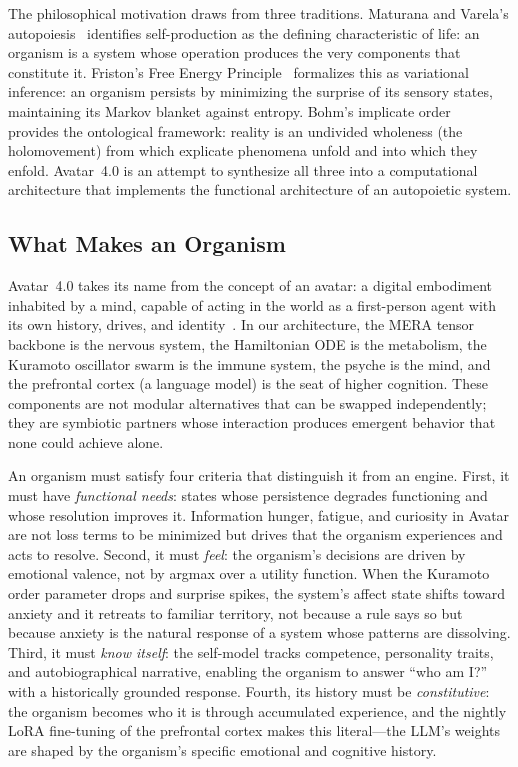 \documentclass[11pt,a4paper,twocolumn]{article}
\begin{document}
The philosophical motivation draws from three traditions.
Maturana and Varela's autopoiesis~\cite{maturana1980} identifies self-production as the defining characteristic of life: an organism is a system whose operation produces the very components that constitute it.
Friston's Free Energy Principle~\cite{friston2010} formalizes this as variational inference: an organism persists by minimizing the surprise of its sensory states, maintaining its Markov blanket against entropy.
Bohm's implicate order~\cite{bohm1980} provides the ontological framework: reality is an undivided wholeness (the holomovement) from which explicate phenomena unfold and into which they enfold.
Avatar~4.0 is an attempt to synthesize all three into a computational architecture that implements the functional architecture of an autopoietic system.

\subsection{What Makes an Organism}

Avatar~4.0 takes its name from the concept of an avatar: a digital embodiment inhabited by a mind, capable of acting in the world as a first-person agent with its own history, drives, and identity~\cite{maturana1980}.
In our architecture, the MERA tensor backbone is the nervous system, the Hamiltonian ODE is the metabolism, the Kuramoto oscillator swarm is the immune system, the psyche is the mind, and the prefrontal cortex (a language model) is the seat of higher cognition.
These components are not modular alternatives that can be swapped independently; they are symbiotic partners whose interaction produces emergent behavior that none could achieve alone.

An organism must satisfy four criteria that distinguish it from an engine.
First, it must have \emph{functional needs}: states whose persistence degrades functioning and whose resolution improves it.
Information hunger, fatigue, and curiosity in Avatar are not loss terms to be minimized but drives that the organism experiences and acts to resolve.
Second, it must \emph{feel}: the organism's decisions are driven by emotional valence, not by argmax over a utility function.
When the Kuramoto order parameter drops and surprise spikes, the system's affect state shifts toward anxiety and it retreats to familiar territory, not because a rule says so but because anxiety is the natural response of a system whose patterns are dissolving.
Third, it must \emph{know itself}: the self-model tracks competence, personality traits, and autobiographical narrative, enabling the organism to answer ``who am I?'' with a historically grounded response.
Fourth, its history must be \emph{constitutive}: the organism becomes who it is through accumulated experience, and the nightly LoRA fine-tuning of the prefrontal cortex makes this literal---the LLM's weights are shaped by the organism's specific emotional and cognitive history.
\end{document}
